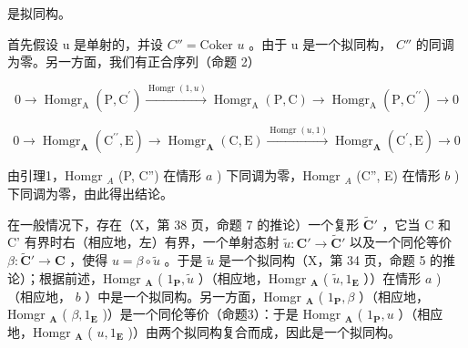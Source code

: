 是拟同构。

首先假设 u 是单射的，并设 \(C'' = \text{Coker } u\) 。由于 u 是一个拟同构， \(C''\) 的同调为零。另一方面，我们有正合序列（命题 2）

\[
0 \rightarrow \operatorname{Homgr} _ {\mathrm{A}} (\mathrm{P}, \mathrm{C} ^ {\prime}) \xrightarrow {\operatorname{Homgr} (1 , u)} \operatorname{Homgr} _ {\mathrm{A}} (\mathrm{P}, \mathrm{C}) \rightarrow \operatorname{Homgr} _ {\mathrm{A}} (\mathrm{P}, \mathrm{C} ^ {\prime \prime}) \rightarrow 0
\]

\[
0 \rightarrow \operatorname{Homgr} _ {\mathbf {A}} \left(\mathrm{C} ^ {\prime \prime}, \mathrm{E}\right)\rightarrow \operatorname{Homgr} _ {\mathbf {A}} (\mathrm{C}, \mathrm{E}) \xrightarrow {\operatorname{Homgr} (u , 1)} \operatorname{Homgr} _ {\mathbf {A}} \left(\mathrm{C} ^ {\prime}, \mathrm{E}\right)\rightarrow 0
\]

由引理1，Homgr \(_{A}\) (P, C'') 在情形 \(a\) ) 下同调为零，Homgr \(_{A}\) (C'', E) 在情形 \(b\) ) 下同调为零，由此得出结论。

在一般情况下，存在（X，第 38 页，命题 7 的推论）一个复形 \(\tilde{\mathbf{C}}'\) ，它当 C 和 C' 有界时右（相应地，左）有界，一个单射态射 \(\tilde{u}: \mathbf{C}' \to \tilde{\mathbf{C}}'\) 以及一个同伦等价 \(\beta: \tilde{\mathbf{C}}' \to \mathbf{C}\) ，使得 \(u = \beta \circ \tilde{u}\) 。于是 \(\tilde{u}\) 是一个拟同构（X，第 34 页，命题 5 的推论）；根据前述，Homgr \(_{\mathbf{A}}\) ( \(1_{\mathbf{P}}, \tilde{u}\) ）（相应地，Homgr \(_{\mathbf{A}}\) ( \(\tilde{u}, 1_{\mathbf{E}}\) ））在情形 \(a\) )（相应地， \(b\) ）中是一个拟同构。另一方面，Homgr \(_{\mathbf{A}}\) ( \(1_{\mathbf{P}}, \beta\) ）（相应地，Homgr \(_{\mathbf{A}}\) ( \(\beta, 1_{\mathbf{E}}\) )）是一个同伦等价（命题3）：于是 Homgr \(_{\mathbf{A}}\) ( \(1_{\mathbf{P}}, u\) ）（相应地，Homgr \(_{\mathbf{A}}\) ( \(u, 1_{\mathbf{E}}\) )）由两个拟同构复合而成，因此是一个拟同构。

